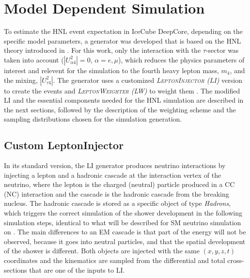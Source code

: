 \section{Model Dependent Simulation} 

To estimate the HNL event expectation in IceCube DeepCore, depending on the specific model parameters, a generator was developed that is based on the HNL theory introduced in . For this work, only the interaction with the $\tau$-sector was taken into account ($|U_{\alpha4}^2|=0$, $\alpha=e,\mu$), which reduces the physics parameters of interest and relevent for the simulation to the fourth heavy lepton mass, $m_4$, and the mixing, $|U_{\tau4}^2|$. The generator uses a customized \textit{\textsc{LeptonInjector} (LI)} version to create the events and \textit{\textsc{LeptonWeighter} (LW)} to weight them . The modified LI and the essential components needed for the HNL simulation are described in the next sections, followed by the description of the weighting scheme and the sampling distributions chosen for the simulation generation.


\subsection{Custom LeptonInjector} 

In its standard version, the LI generator produces neutrino interactions by injecting a lepton and a hadronic cascade at the interaction vertex of the neutrino, where the lepton is the charged (neutral) particle produced in a CC (NC) interaction and the cascade is the hadronic cascade from the breaking nucleus. The hadronic cascade is stored as a specific object of type \textit{Hadrons}, which triggers the correct simulation of the shower development in the following simulation steps, identical to what will be described for SM neutrino simulation on . The main differences to an EM cascade is that part of the energy will not be observed, because it goes into neutral particles, and that the spatial development of the shower is different. Both objects are injected with the same $(x,y,z,t)$ coordinates and the kinematics are sampled from the differential and total cross-sections that are one of the inputs to LI.


